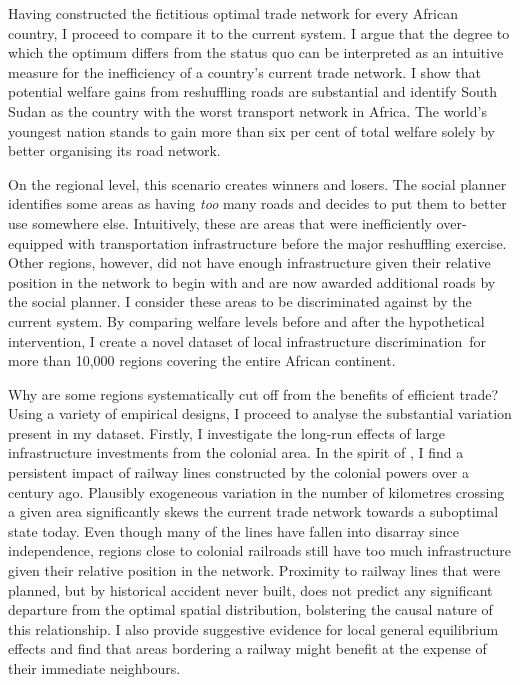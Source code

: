 \documentclass[11pt, oneside]{article}   	%
\begin{document}
Having constructed the fictitious optimal trade network for every African country, I proceed to compare it to the current system. I argue that the degree to which the optimum differs from the status quo can be interpreted as an intuitive measure for the inefficiency of a country's current trade network. I show that potential welfare gains from reshuffling roads are substantial and identify South Sudan as the country with the worst transport network in Africa. The world's youngest nation stands to gain more than six per cent of total welfare solely by better organising its road network.

On the regional level, this scenario creates winners and losers. The social planner identifies some areas as having \emph{too} many roads and decides to put them to better use somewhere else. Intuitively, these are areas that were inefficiently over-equipped with transportation infrastructure before the major reshuffling exercise. Other regions, however, did not have enough infrastructure given their relative position in the network to begin with and are now awarded additional roads by the social planner. I consider these areas to be discriminated against by the current system. By comparing welfare levels before and after the hypothetical intervention, I create a novel dataset of local infrastructure discrimination for more than 10,000 regions covering the entire African continent.

Why are some regions systematically cut off from the benefits of efficient trade? Using a variety of empirical designs, I proceed to analyse the substantial variation present in my dataset. Firstly, I investigate the long-run effects of large infrastructure investments from the colonial area. In the spirit of \cite{jedwab_permanent_2016}, I find a persistent impact of railway lines constructed by the colonial powers over a century ago. Plausibly exogeneous variation in the number of kilometres crossing a given area significantly skews the current trade network towards a suboptimal state today. Even though many of the lines have fallen into disarray since independence, regions close to colonial railroads still have too much infrastructure given their relative position in the network. Proximity to railway lines that were planned, but by historical accident never built, does not predict any significant departure from the optimal spatial distribution, bolstering the causal nature of this relationship. I also provide suggestive evidence for local general equilibrium effects and find that areas bordering a railway might benefit at the expense of their immediate neighbours.
\end{document}
